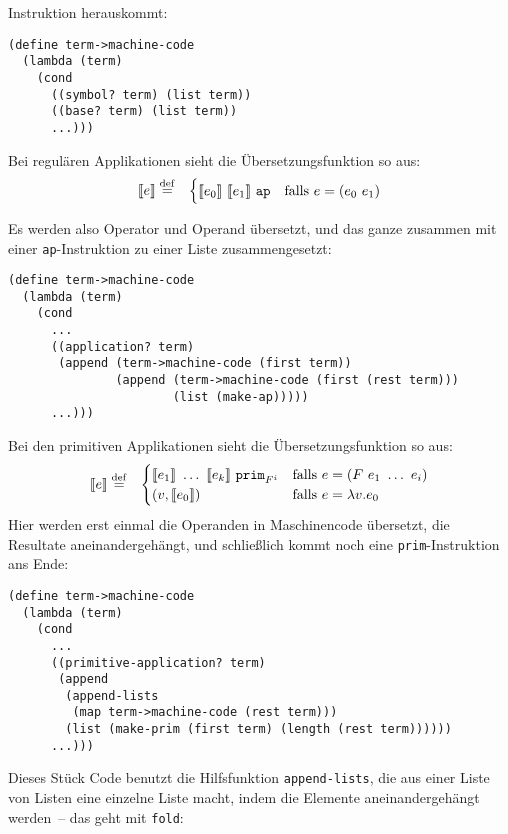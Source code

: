 Instruktion herauskommt:
%
\begin{lstlisting}
(define term->machine-code
  (lambda (term)
    (cond
      ((symbol? term) (list term))
      ((base? term) (list term))
      ...)))
\end{lstlisting}
%
Bei regulären Applikationen sieht die Übersetzungsfunktion so aus:
%
\begin{eqnarray*}
  \llbracket e \rrbracket &\stackrel{\rm def}{=}&
  \begin{cases}
    \llbracket e_0\rrbracket~\llbracket e_1\rrbracket~\mathtt{ap}
    & \textrm{falls $e = (e_0~e_1)$}\\
  \end{cases}
\end{eqnarray*}

Es werden also Operator und Operand übersetzt, und das ganze zusammen
mit einer \lstinline{ap}-Instruktion zu einer Liste zusammengesetzt:
%
\begin{lstlisting}
(define term->machine-code
  (lambda (term)
    (cond
      ...
      ((application? term)
       (append (term->machine-code (first term))
               (append (term->machine-code (first (rest term)))
                       (list (make-ap)))))
      ...)))
\end{lstlisting}
%
Bei den primitiven Applikationen sieht die Übersetzungsfunktion so
aus:
%
\begin{eqnarray*}
  \llbracket e \rrbracket &\stackrel{\rm def}{=}&
  \begin{cases}
    \llbracket e_1\rrbracket~\ldots~\llbracket e_k\rrbracket~\mathtt{prim}_{F^i}
    & \textrm{falls $e = (F~e_1~\ldots~e_i)$}\\
    (v, \llbracket e_0\rrbracket) & \textrm{falls $e = \lambda v.e_0$}
  \end{cases}
\end{eqnarray*}
%
Hier werden erst einmal die Operanden in Maschinencode übersetzt, die
Resultate aneinandergehängt, und schließlich kommt noch eine
\lstinline{prim}-Instruktion ans Ende:
%
\begin{lstlisting}
(define term->machine-code
  (lambda (term)
    (cond
      ...
      ((primitive-application? term)
       (append
        (append-lists
         (map term->machine-code (rest term)))
        (list (make-prim (first term) (length (rest term))))))
      ...)))
\end{lstlisting}
%
Dieses Stück Code benutzt die Hilfsfunktion \lstinline{append-lists}, die
aus einer Liste von Listen eine einzelne Liste macht, indem die
Elemente aneinandergehängt werden~-- das geht mit \lstinline{fold}:
